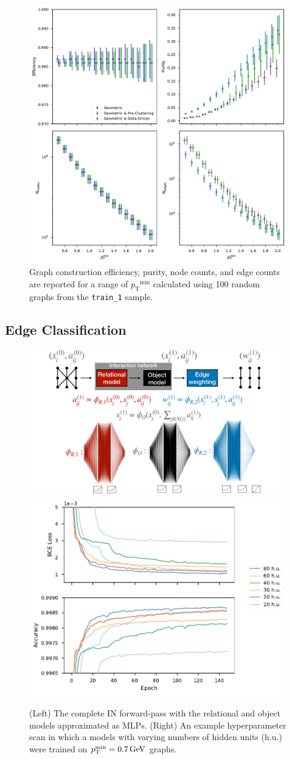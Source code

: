 \documentclass[twocolumn]{svjour3}
\newcommand{\pt}{\ensuremath{p_{\mathrm{T}}}\xspace}
\newcommand{\GeV}{\ensuremath{\,\text{Ge\hspace{-.08em}V}}\xspace}
\begin{document}
\begin{figure}[!htbp]
\centering
\includegraphics[width=\columnwidth]{graph_construction_measurements.pdf}
\caption{Graph construction efficiency, purity, node counts, and edge counts are reported for a range of $\pt^\mathrm{min}$ calculated using 100 random graphs from the \texttt{train\_1} sample.}
\label{fig:build-measurements} 
\end{figure}

\subsection{Edge Classification}
\label{sec:edgeclass}

\begin{figure}[!htbp]
\centering
  \includegraphics[width=.5\linewidth]{network_diagram.pdf}
  \includegraphics[width=.4\linewidth]{hyperparam_scans_0p7.pdf}
\caption{(Left) The complete IN forward-pass with the relational and object models approximated as MLPs.
(Right) An example hyperparameter scan in which a models with varying numbers of hidden units (h.u.) were trained on $\pt^\mathrm{min}=0.7\GeV$ graphs.}
\label{fig:forward-pass}
\end{figure}
\end{document}
